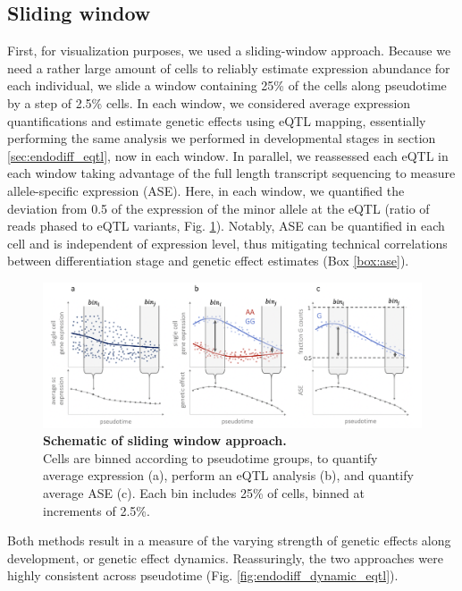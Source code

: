 \subsection{Sliding window}

First, for visualization purposes, we used a sliding-window approach. 
Because we need a rather large amount of cells to reliably estimate expression abundance for each individual, we slide a window containing 25\% of the cells along pseudotime by a step of 2.5\% cells.
In each window, we considered average expression quantifications and estimate genetic effects using eQTL mapping, essentially performing the same analysis we performed in developmental stages in section \ref{sec:endodiff_eqtl}, now in each window.
In parallel, we reassessed each eQTL in each window taking advantage of the full length transcript sequencing to measure allele-specific expression (ASE).
Here, in each window, we quantified the deviation from 0.5 of the expression of the minor allele at the eQTL (ratio of reads phased to eQTL variants, Fig. \ref{fig:endodiff_sliding_window}). 
Notably, ASE can be quantified in each cell and is independent of expression level, thus mitigating technical correlations between differentiation stage and genetic effect estimates (Box \ref{box:ase}). 

\begin{figure}[h]
\centering
\includegraphics[width=15.5cm]{Chapter4/Fig/endodiff_running_average.png}
\caption[Schematic of sliding window approach]{\textbf{Schematic of sliding window approach.}\\
Cells are binned according to pseudotime groups, to quantify average expression (a), perform an eQTL analysis (b), and quantify average ASE (c).
Each bin includes 25\% of cells, binned at increments of 2.5\%.}
\label{fig:endodiff_sliding_window}
\end{figure}


Both methods result in a measure of the varying strength of genetic effects along development, or genetic effect dynamics. 
Reassuringly, the two approaches were highly consistent across pseudotime (Fig. \ref{fig:endodiff_dynamic_eqtl}).

